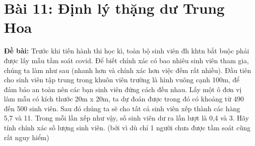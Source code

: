 \documentclass[12pt]{article}
\begin{document}
\begin{sloppypar}
\section{Bài 11: Định lý thặng dư Trung Hoa}
\begin{tcolorbox}
    \textbf{Đề bài:} Trước khi tiến hành thi học kì, toàn bộ sinh viên đh khtn bắt buộc phải được lấy mẫu tầm soát covid. Để biết chính xác có bao nhiêu sinh viên tham gia, chúng ta làm như sau (nhanh hơn và chính xác hơn việc đếm rất nhiều).
    Đầu tiên cho sinh viên tập trung trong khuôn viên trường là hình vuông cạnh 100m, để đảm bảo an toàn nên các bạn sinh viên đứng cách đều nhau. Lấy một ô đơn vị làm mẫu có kích thước 20m x 20m, ta dự đoán được trong đó có khoảng từ 490 đến 500 sinh viên. Sau đó chúng ta sẽ cho tất cả sinh viên xếp thành các hàng 5,7 và 11. Trong mỗi lần xếp như vậy, số sinh viên dư ra lần lượt là 0,4 và 3. Hãy tính chính xác số lượng sinh viên. (bởi vì dù chỉ 1 người chưa được tầm soát cũng rất nguy hiểm)
\end{tcolorbox}
\end{sloppypar}
\end{document}
